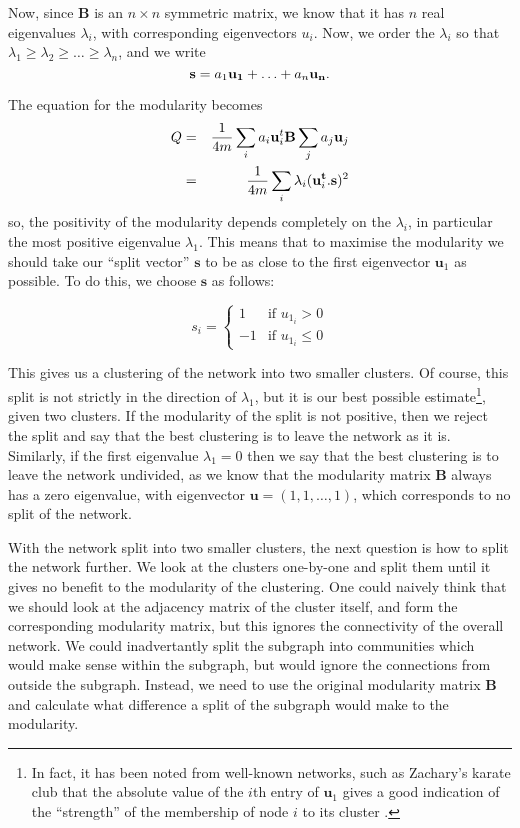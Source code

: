 \documentclass[a4paper,12pt]{report}
\begin{document}
Now, since $\mathbf{B}$ is an $n\times n$ symmetric matrix, we know that
it has $n$ real eigenvalues $\lambda_i$, with corresponding
eigenvectors $u_i$.  Now, we order the $\lambda_i$ so that $
\lambda_1 \geq \lambda_2 \geq \ldots \geq \lambda_n$, and we write 
$$
{\bf s} = a_1{\bf u_1}+ \ldots + a_n{\bf u_n}.
$$


The equation for the modularity becomes
\begin{eqnarray}
Q & = & \frac{1}{4m} \sum_{i} a_i{\bf u}_i^t{\bf B}\sum_ja_j{\bf u}_j\cr
& = & \frac{1}{4m} \sum_i \lambda_i ({\bf u}_i^{\bf t}.{\bf s})^2
\end{eqnarray}
so, the positivity of the modularity depends completely on the $\lambda_i$, in 
particular the most positive eigenvalue $\lambda_1$.  This means that to 
maximise the modularity we should take our ``split vector'' $\mathbf{s}$ to be 
as close to the first eigenvector $\mathbf{u}_1$ as possible. To do this, we 
choose $\mathbf{s}$ as follows:

\begin{equation}
s_i =\left\{ \begin{array}{ll} 1 & \mbox{if } u_{1_i}>0 \\
-1 & \mbox{if } u_{1_i}\leq0 \end{array} \right.
\end{equation}

This gives us a clustering of the network into two smaller clusters. Of course, 
this split is not strictly in the direction of $\lambda_1$, but it is our best 
possible estimate\footnote{In fact, it has been noted from well-known networks, 
such as Zachary's karate club \cite{Zachary1977a} that the absolute value of 
the $i$th entry of $\mathbf{u}_1$ gives a good indication of the ``strength'' 
of the membership of node $i$ to its cluster \cite{Newman2006a}.}, given two 
clusters. If the modularity of the split is not positive, then we reject the 
split and say that the best clustering is to leave the network as it is.  
Similarly, if the first eigenvalue $\lambda_1 = 0$ then we say that the best 
clustering is to leave the network undivided, as we know that the modularity 
matrix $\mathbf{B}$ always has a zero eigenvalue, with eigenvector 
$\mathbf{u} = ( 1,1, \ldots, 1)$, which corresponds to no split of the network.

With the network split into two smaller clusters, the next
question is how to split the network further.  We look at the clusters
one-by-one and split them until it gives no benefit to the modularity
of the clustering.  One could naively think that we should look at the
adjacency matrix of the cluster itself, and form the 
corresponding modularity matrix, but this ignores the connectivity of the
overall network.  We could inadvertantly split the subgraph into communities 
which would make sense within the subgraph, but would ignore the connections 
from outside the subgraph. Instead, we need to use the original modularity 
matrix $\mathbf{B}$ and calculate what difference a split of the subgraph would 
make to the modularity.
\end{document}
